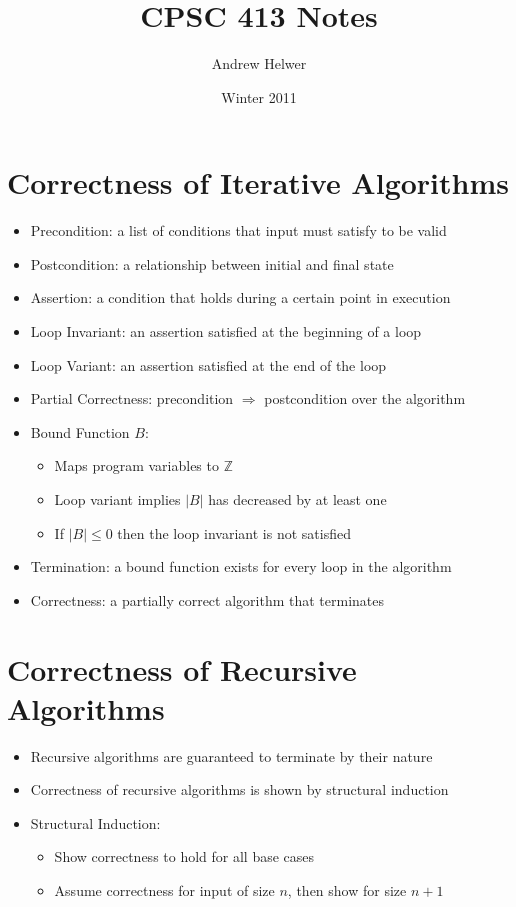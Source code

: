 \documentclass{article}
\begin{document}
\title{CPSC 413 Notes}
\author{Andrew Helwer}
\date{Winter 2011}
\maketitle

\section{Correctness of Iterative Algorithms}

\begin{itemize}
\item Precondition: a list of conditions that input must satisfy to be valid
\item Postcondition: a relationship between initial and final state
\item Assertion: a condition that holds during a certain point in execution
\item Loop Invariant: an assertion satisfied at the beginning of a loop
\item Loop Variant: an assertion satisfied at the end of the loop
\item Partial Correctness: precondition $\Rightarrow$ postcondition over the
algorithm
\item Bound Function $B$:
\begin{itemize}
\item Maps program variables to $\mathbb{Z}$
\item Loop variant implies $|B|$ has decreased by at least one
\item If $|B| \leq 0$ then the loop invariant is not satisfied
\end{itemize}
\item Termination: a bound function exists for every loop in the algorithm
\item Correctness: a partially correct algorithm that terminates
\end{itemize}

\section{Correctness of Recursive Algorithms}

\begin{itemize}
\item Recursive algorithms are guaranteed to terminate by their nature
\item Correctness of recursive algorithms is shown by structural induction
\item Structural Induction:
\begin{itemize}
\item Show correctness to hold for all base cases
\item Assume correctness for input of size $n$, then show for size $n+1$
\end{itemize}
\end{itemize}
\end{document}
